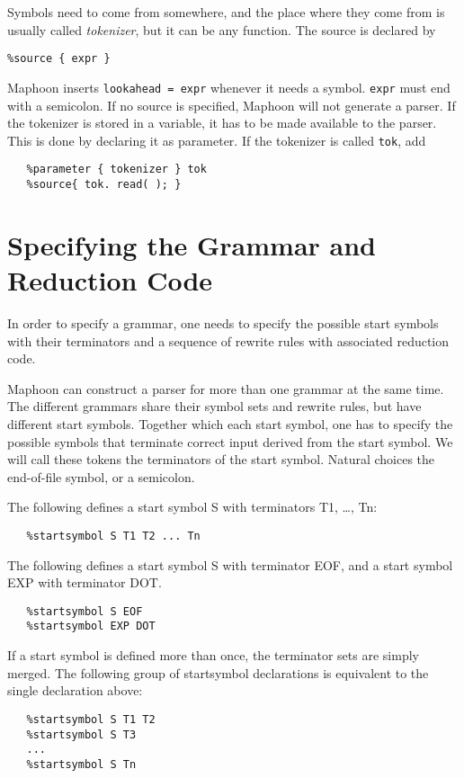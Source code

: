 \documentclass{article}
\begin{document}
\noindent
Symbols need to come from somewhere, and the place
where they come from is usually called \emph{tokenizer},
but it can be any function. 
The source is declared by 
\begin{verbatim}
%source { expr }   
\end{verbatim}
Maphoon inserts \verb+lookahead = expr+ whenever it needs
a symbol. \verb+expr+ must end with a semicolon.
If no source is specified,
Maphoon will not generate a parser.
If the tokenizer is stored in a variable, it has to be made available
to the parser. This is done by declaring it
as parameter. 
If the tokenizer is called \verb+tok+, add
\begin{verbatim}
   %parameter { tokenizer } tok
   %source{ tok. read( ); }
\end{verbatim}

\section{Specifying the Grammar and Reduction Code}

In order to specify a grammar, one needs to specify
the possible start symbols with their
terminators and a sequence of rewrite rules
with associated reduction code.

Maphoon can construct a parser for more than one grammar at the
same time. The different grammars share their symbol sets and 
rewrite rules, but have different start symbols. 
Together which each start symbol, one has to specify the 
possible symbols that terminate correct input derived from the
start symbol. We will call these tokens
the terminators of the start symbol.
Natural choices the end-of-file symbol, or a semicolon.

\noindent
The following defines a start symbol S with terminators
T1, \ldots, Tn:
\begin{verbatim}
   %startsymbol S T1 T2 ... Tn  
\end{verbatim}
The following defines a start symbol S with terminator
EOF, and a start symbol EXP with terminator DOT.
\begin{verbatim}
   %startsymbol S EOF
   %startsymbol EXP DOT
\end{verbatim}
If a start symbol is defined more than once, the terminator
sets are simply merged. The following group of startsymbol declarations
is equivalent to the single declaration above:

\begin{verbatim}
   %startsymbol S T1 T2 
   %startsymbol S T3 
   ...
   %startsymbol S Tn 
\end{verbatim}
\end{document}

